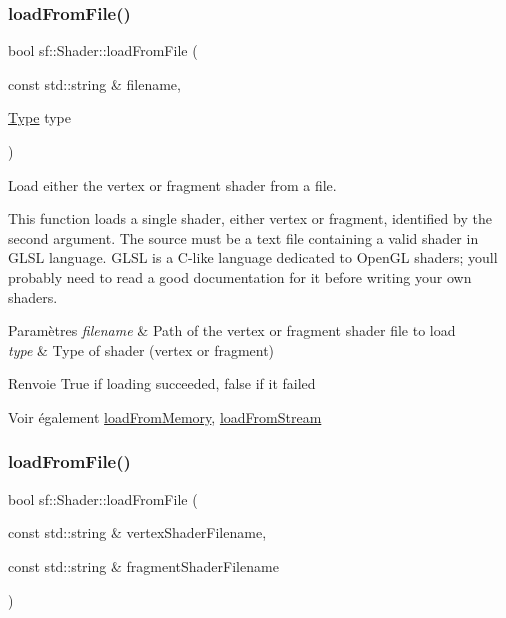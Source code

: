 \subsubsection{\texorpdfstring{load\+From\+File()}{loadFromFile()}\hspace{0.1cm}{\footnotesize\ttfamily [1/2]}}
{\footnotesize\ttfamily bool sf\+::\+Shader\+::load\+From\+File (\begin{DoxyParamCaption}\item[{const std\+::string \&}]{filename,  }\item[{\hyperlink{classsf_1_1Shader_afaa1aa65e5de37b74d047da9def9f9b3}{Type}}]{type }\end{DoxyParamCaption})}



Load either the vertex or fragment shader from a file. 

This function loads a single shader, either vertex or fragment, identified by the second argument. The source must be a text file containing a valid shader in G\+L\+SL language. G\+L\+SL is a C-\/like language dedicated to Open\+GL shaders; you\textquotesingle{}ll probably need to read a good documentation for it before writing your own shaders.


\begin{DoxyParams}{Paramètres}
{\em filename} & Path of the vertex or fragment shader file to load \\
\hline
{\em type} & Type of shader (vertex or fragment)\\
\hline
\end{DoxyParams}
\begin{DoxyReturn}{Renvoie}
True if loading succeeded, false if it failed
\end{DoxyReturn}
\begin{DoxySeeAlso}{Voir également}
\hyperlink{classsf_1_1Shader_ac92d46bf71dff2d791117e4e472148aa}{load\+From\+Memory}, \hyperlink{classsf_1_1Shader_a2ee1b130c0606e4f8bcdf65c1efc2a53}{load\+From\+Stream} 
\end{DoxySeeAlso}
\mbox{\label{classsf_1_1Shader_ac9d7289966fcef562eeb92271c03e3dc}} 
\subsubsection{\texorpdfstring{load\+From\+File()}{loadFromFile()}\hspace{0.1cm}{\footnotesize\ttfamily [2/2]}}
{\footnotesize\ttfamily bool sf\+::\+Shader\+::load\+From\+File (\begin{DoxyParamCaption}\item[{const std\+::string \&}]{vertex\+Shader\+Filename,  }\item[{const std\+::string \&}]{fragment\+Shader\+Filename }\end{DoxyParamCaption})}



